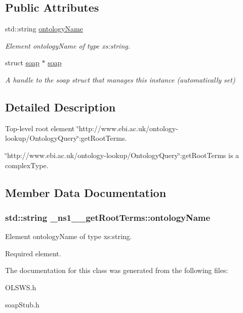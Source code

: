 \subsection*{Public Attributes}
\begin{DoxyCompactItemize}
\item 
std::string \hyperlink{class__ns1____getRootTerms_adaba05548e5bfdb1ef7c248c6cc208c8}{ontologyName}
\begin{DoxyCompactList}\small\item\em Element ontologyName of type xs:string. \end{DoxyCompactList}\item 
\hypertarget{class__ns1____getRootTerms_a5977ecb374080d7b50fd520045415acd}{
struct \hyperlink{class__ns1____getRootTerms_a5977ecb374080d7b50fd520045415acd}{soap} $\ast$ \hyperlink{class__ns1____getRootTerms_a5977ecb374080d7b50fd520045415acd}{soap}}
\label{class__ns1____getRootTerms_a5977ecb374080d7b50fd520045415acd}

\begin{DoxyCompactList}\small\item\em A handle to the soap struct that manages this instance (automatically set) \end{DoxyCompactList}\end{DoxyCompactItemize}


\subsection{Detailed Description}
Top-\/level root element \char`\"{}http://www.ebi.ac.uk/ontology-\/lookup/OntologyQuery\char`\"{}:getRootTerms. 

\char`\"{}http://www.ebi.ac.uk/ontology-\/lookup/OntologyQuery\char`\"{}:getRootTerms is a complexType. 

\subsection{Member Data Documentation}
\hypertarget{class__ns1____getRootTerms_adaba05548e5bfdb1ef7c248c6cc208c8}{
\subsubsection[{ontologyName}]{\setlength{\rightskip}{0pt plus 5cm}std::string {\bf \_\-ns1\_\-\_\-getRootTerms::ontologyName}}}
\label{class__ns1____getRootTerms_adaba05548e5bfdb1ef7c248c6cc208c8}


Element ontologyName of type xs:string. 

Required element. 

The documentation for this class was generated from the following files:\begin{DoxyCompactItemize}
\item 
OLSWS.h\item 
soapStub.h\end{DoxyCompactItemize}
